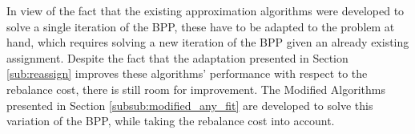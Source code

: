 In view of the fact that the existing approximation algorithms were developed to
solve a single iteration of the BPP, these have to be adapted to the problem at
hand, which requires solving a new iteration of the BPP given an already
existing assignment. Despite the fact that the adaptation presented in Section
\ref{sub:reassign} improves these algorithms' performance with respect to the
rebalance cost, there is still room for improvement. The Modified Algorithms
presented in Section \ref{subsub:modified_any_fit} are developed to solve this
variation of the BPP, while taking the rebalance cost into account.



